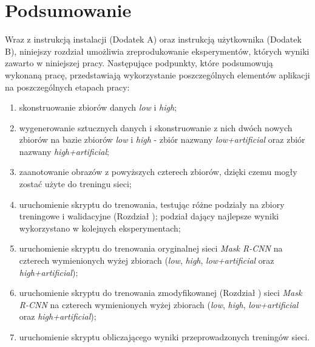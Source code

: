 \section{Podsumowanie}
Wraz z instrukcją instalacji (Dodatek A) oraz instrukcją użytkownika (Dodatek B), niniejszy rozdział umożliwia zreprodukowanie eksperymentów, których wyniki zawarto w niniejszej pracy.
Następujące podpunkty, które podsumowują wykonaną pracę, przedstawiają wykorzystanie poszczególnych elementów aplikacji na poszczególnych etapach pracy:

\begin{enumerate}
 \item skonstruowanie zbiorów danych \textit{low} i \textit{high};
 \item wygenerowanie sztucznych danych i skonstruowanie z nich dwóch nowych zbiorów na bazie zbiorów \textit{low} i \textit{high} - zbiór nazwany \textit{low+artificial} oraz zbiór nazwany \textit{high+artificial};
 \item zaanotowanie obrazów z powyższych czterech zbiorów, dzięki czemu mogły zostać użyte do treningu sieci;
 \item uruchomienie skryptu do trenowania, testując różne podziały na zbiory treningowe i walidacyjne (Rozdział ); podział dający najlepsze wyniki wykorzystano w kolejnych eksperymentach;
 \item uruchomienie skryptu do trenowania oryginalnej sieci \textit{Mask R-CNN} na czterech wymienionych wyżej zbiorach (\textit{low}, \textit{high}, \textit{low+artificial} oraz \textit{high+artificial});
 \item uruchomienie skryptu do trenowania zmodyfikowanej (Rozdział ) sieci \textit{Mask R-CNN} na czterech wymienionych wyżej zbiorach (\textit{low}, \textit{high}, \textit{low+artificial} oraz \textit{high+artificial});
 \item uruchomienie skryptu obliczającego wyniki przeprowadzonych treningów sieci.
\end{enumerate}
